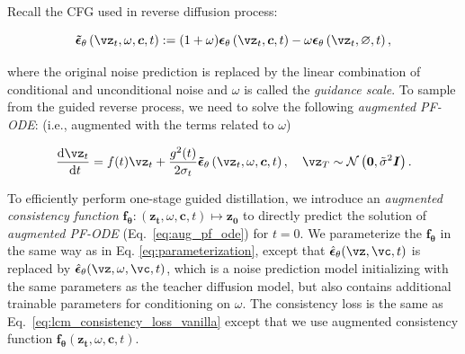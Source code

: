 \documentclass{article} %
\begin{document}
Recall the CFG used in reverse diffusion process:
\begin{footnotesize}
\begin{equation}
    \boldsymbol{\tilde{\epsilon}}_{\theta}\left(\boldsymbol{\vz}_t, \omega, \boldsymbol{c}, t\right):= (1 + \omega) \boldsymbol{\epsilon}_\theta\left(\boldsymbol{\vz}_t, \boldsymbol{c}, t\right) - \omega \boldsymbol{\epsilon}_\theta\left(\boldsymbol{\vz}_t, \varnothing, t\right),
\end{equation}
\end{footnotesize}
where the original noise prediction is replaced by the linear combination of conditional and unconditional noise and  $\omega$ is called the {\em guidance scale}. To sample from the guided reverse process, we need to solve
the following {\em augmented PF-ODE}: (i.e., augmented with the terms related to $\omega$)
\begin{small}
\begin{equation}
    \frac{\mathrm{d} \boldsymbol{\vz}_t}{\mathrm{~d} t}= f(t) \boldsymbol{\vz}_t+\frac{g^2(t)}{2 \sigma_t} \boldsymbol{\tilde{\epsilon}}_{\theta}\left(\boldsymbol{\vz}_t, \omega, \boldsymbol{c},  t\right), \quad \boldsymbol{\vz}_T \sim \mathcal{N}\left(\mathbf{0}, \tilde{\sigma}^2 \boldsymbol{I}\right).
    \label{eq:aug_pf_ode}
\end{equation}
\end{small}
To efficiently perform one-stage guided distillation, we introduce
an {\em augmented consistency function} 
$\boldsymbol{f_{\theta}}: (\boldsymbol{z_t}, \omega, \boldsymbol{c}, t) \mapsto \boldsymbol{z_0}$
to directly predict the solution of {\em{augmented PF-ODE}} (Eq.~\ref{eq:aug_pf_ode}) for $t=0$. We parameterize the $\boldsymbol{f_{\theta}}$
in the same way as in Eq. \ref{eq:parameterization}, except that
$\hat{\boldsymbol{\epsilon}}_\theta(\vz,\vc,t)$ is replaced by 
$\hat{\boldsymbol{\epsilon}}_\theta(\vz,\omega, \vc,t)$, which is a noise prediction model initializing with the same parameters as the teacher diffusion model, but also contains additional trainable parameters for conditioning on $\omega$. The consistency loss is 
the same as Eq.~\ref{eq:lcm_consistency_loss_vanilla}
except that we use augmented consistency function
$\boldsymbol{f_{\theta}}(\boldsymbol{z_t}, \omega, \boldsymbol{c}, t)$. 
\end{document}
